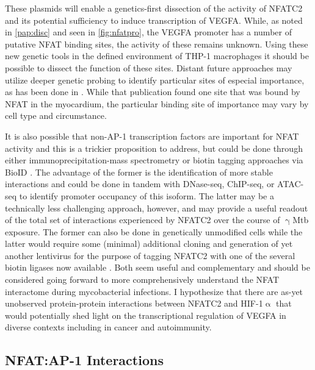 \doublespacing

These plasmids will enable a genetics-first dissection of the activity of NFATC2 and its potential sufficiency to induce transcription of VEGFA. While, as noted in \autoref{pap:disc} and seen in \autoref{fig:nfatpro}, the VEGFA promoter has a number of putative NFAT binding sites, the activity of these remains unknown. Using these new genetic tools in the defined environment of THP-1 macrophages it should be possible to dissect the function of these sites. Distant future approaches may utilize deeper genetic probing to identify particular sites of especial importance, as has been done in \citet{Chang2004}. While that publication found one site that was bound by NFAT in the myocardium, the particular binding site of importance may vary by cell type and circumstance. 

It is also possible that non-AP-1 transcription factors are important for NFAT activity and this is a trickier proposition to address, but could be done through either immunoprecipitation-mass spectrometry or biotin tagging approaches via BioID \citep{Roux2012}. The advantage of the former is the identification of more stable interactions and could be done in tandem with DNase-seq, ChIP-seq, or ATAC-seq to identify promoter occupancy of this isoform. The latter may be a technically less challenging approach, however, and may provide a useful readout of the total set of interactions experienced by NFATC2 over the course of $\upgamma$Mtb exposure. The former can also be done in genetically unmodified cells while the latter would require some (minimal) additional cloning and generation of yet another lentivirus for the purpose of tagging NFATC2 with one of the several biotin ligases now available \citep{Cho2020}. Both seem useful and complementary and should be considered going forward to more comprehensively understand the NFAT interactome during mycobacterial infections. I hypothesize that there are as-yet unobserved protein-protein interactions between NFATC2 and HIF-1$\upalpha$ that would potentially shed light on the transcriptional regulation of VEGFA in diverse contexts including in cancer and autoimmunity. 

\subsection{NFAT:AP-1 Interactions}

\citep{Boise1993, Eferl2003}

